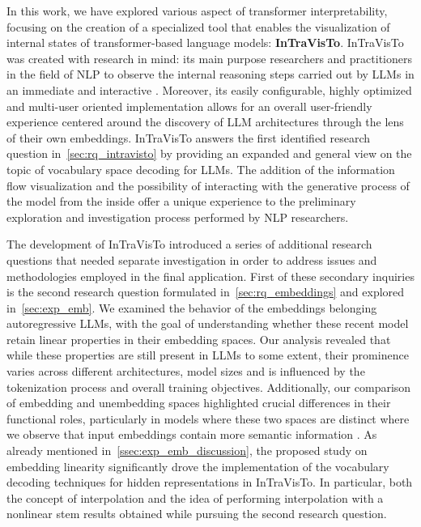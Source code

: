 In this work, we have explored various aspect of transformer interpretability, focusing on the creation of a specialized tool that enables the visualization of internal states of transformer-based language models: \textbf{InTraVisTo}.
InTraVisTo was created with research in mind: its main purpose  researchers and practitioners in the field of NLP to observe the internal reasoning steps carried out by LLMs in an immediate and interactive .
Moreover, its easily configurable, highly optimized and multi-user oriented implementation allows for an overall user-friendly experience centered around the discovery of LLM architectures through the lens of their own embeddings.
InTraVisTo answers the first identified research question in~\cref{sec:rq_intravisto} by providing an expanded and general view on the topic of vocabulary space decoding for LLMs.
The addition of the information flow visualization and the possibility of interacting with the generative process of the model from the inside offer a unique experience  to the preliminary exploration and investigation process performed by NLP researchers.

The development of InTraVisTo introduced a series of additional research questions that needed separate investigation in order to address  issues and  methodologies employed in the final application.
First of these secondary inquiries is the second research question formulated in~\cref{sec:rq_embeddings} and explored in~\cref{sec:exp_emb}.
We examined the behavior of the embeddings belonging autoregressive LLMs, with the  goal of understanding whether these recent model retain linear properties in their embedding spaces.
Our analysis revealed that while these properties are still present in LLMs to some extent, their prominence varies across different architectures, model sizes and is  influenced by the tokenization process and overall training objectives.
Additionally, our comparison of embedding and unembedding spaces highlighted crucial differences in their functional roles, particularly in models where these two spaces are distinct where we observe that input embeddings contain more semantic information .
As already mentioned in~\cref{ssec:exp_emb_discussion}, the proposed study on embedding linearity significantly drove the implementation of the vocabulary decoding techniques for hidden representations in InTraVisTo.
In particular, both the concept of interpolation and the idea of performing interpolation with a nonlinear  stem results obtained while pursuing the second research question.

